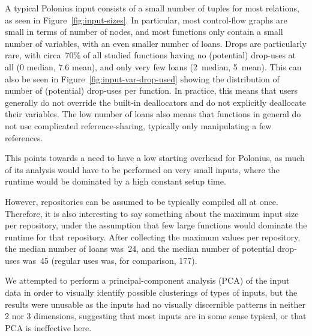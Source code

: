 \documentclass[11pt,a4paper,twoside,openany]{report}
\begin{document}
A typical Polonius input consists of a small number of tuples for most
relations, as seen in Figure~\ref{fig:input-sizes}. In particular, most
control-flow graphs are small in terms of number of nodes, and most functions
only contain a small number of variables, with an even smaller number of loans.
Drops are particularly rare, with circa~70\% of all studied functions having
no (potential) drop-uses at all (0 median, 7.6 mean), and only very few
loans (2~median, 5~mean). This can also be seen in
Figure~\ref{fig:input-var-drop-used} showing the distribution of number of
(potential) drop-uses per function. In practice, this means that users generally
do not override the built-in deallocators and do not explicitly deallocate their
variables. The low number of loans also means that functions in general do not
use complicated reference-sharing, typically only manipulating a few references.

This points towards a need to have a low starting overhead for Polonius, as
much of its analysis would have to be performed on very small inputs, where the
runtime would be dominated by a high constant setup time.

However, repositories can be assumed to be typically compiled all at once.
Therefore, it is also interesting to say something about the maximum input size
per repository, under the assumption that few large functions would dominate the
runtime for that repository. After collecting the maximum values per repository,
the median number of loans was~24, and the median number of potential drop-uses
was~45 (regular uses was, for comparison, 177).

We attempted to perform a principal-component analysis (PCA) of the input data
in order to visually identify possible clusterings of types of inputs, but the
results were unusable as the inputs had no visually discernible patterns in
neither 2 nor 3 dimensions, suggesting that most inputs are in some sense
typical, or that PCA is ineffective here.
\end{document}
